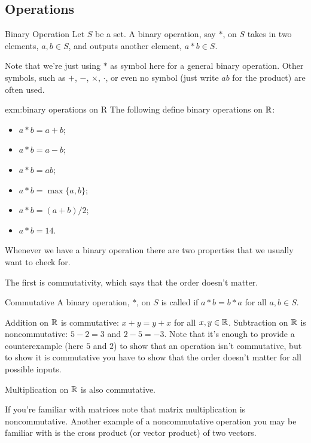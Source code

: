\documentclass[fleqn]{LectureClass/LectureClass}
\begin{document}
    \subsection{Operations}
    \begin{dfn}{Binary Operation}{}
        Let \(S\) be a set.
        A binary operation, say \(*\), on \(S\) takes in two elements, \(a, b \in S\), and outputs another element, \(a * b \in S\).
    \end{dfn}
    
    Note that we're just using \(*\) as symbol here for a general binary operation.
    Other symbols, such as \(+\), \(-\), \(\times\), \(\cdot\), or even no symbol (just write \(ab\) for the product) are often used.
    
    \begin{exm}{}{exm:binary operations on R}
        The following define binary operations on \(\mathbb{R}\):
        \begin{itemize}
            \item \(a * b = a + b\);
            \item \(a * b = a - b\);
            \item \(a * b = ab\);
            \item \(a * b = \max\{a, b\}\);
            \item \(a * b = (a + b) / 2\);
            \item \(a * b = 14\).
        \end{itemize}
    \end{exm}
    
    Whenever we have a binary operation there are two properties that we usually want to check for.
    
    The first is commutativity, which says that the order doesn't matter.
    
    \begin{dfn}{Commutative}{}
        A binary operation, \(*\), on \(S\) is called  if \(a * b = b * a\) for all \(a, b \in S\).
    \end{dfn}
    
    \begin{exm}{}{}
        Addition on \(\mathbb{R}\) is commutative: \(x + y = y + x\) for all \(x, y \in \mathbb{R}\).
        Subtraction on \(\mathbb{R}\) is noncommutative: \(5 - 2 = 3\) and \(2 - 5 = -3\).
        Note that it's enough to provide a counterexample (here \(5\) and \(2\)) to show that an operation isn't commutative, but to show it is commutative you have to show that the order doesn't matter for all possible inputs.
        
        Multiplication on \(\mathbb{R}\) is also commutative.
        
        If you're familiar with matrices note that matrix multiplication is noncommutative.
        Another example of a noncommutative operation you may be familiar with is the cross product (or vector product) of two vectors.
    \end{exm}
    
\end{document}
